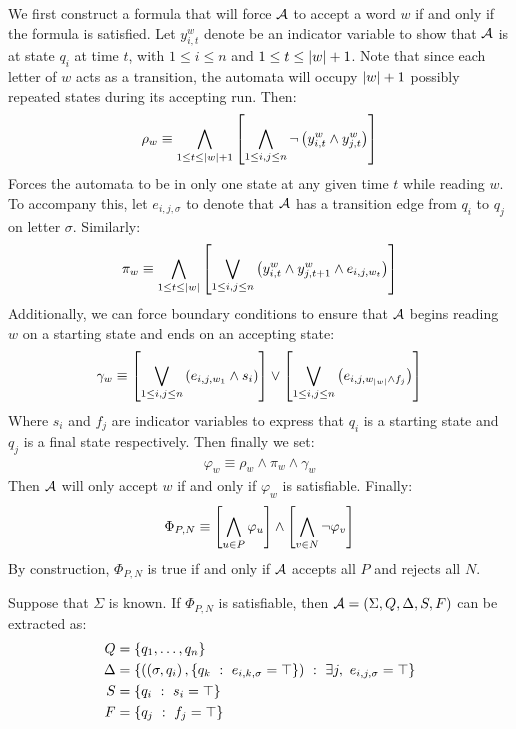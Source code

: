 We first construct a formula that will force \(\mathcal{A}\) to accept
a word \(w\) if and only if the formula is satisfied.
Let \(y_{i, t}^w\) denote be an indicator variable
to show that \(\mathcal{A}\) is at state \(q_i\) at time \(t\),
with \(1 \leq i \leq n\) and \(1 \leq t \leq \left\lvert w\right\rvert + 1\).
Note that since each letter of \(w\) acts as a transition,
the automata will occupy \(\left\lvert w\right\rvert + 1\) possibly repeated
states during its accepting run.
Then:
\begin{align*}
  \rho_w \equiv
    \bigwedge_{1 \leq t \leq \left\lvert w\right\rvert + 1}
      \left[\bigwedge_{1 \leq i, j \leq n}
        \neg \left(y_{i, t} ^w \land y_{j, t} ^w\right)\right]
\end{align*}
Forces the automata to be in only one state at any given time \(t\)
while reading \(w\).
To accompany this, let \(e_{i, j, \sigma}\) to denote
that \(\mathcal{A}\) has a transition edge from \(q_i\) to \(q_j\)
on letter \(\sigma\).
Similarly:
\begin{align*}
  \pi_w \equiv
    \bigwedge_{1 \leq t \leq \left\lvert w\right\rvert}
      \left[\bigvee_{1 \leq i, j \leq n}
      \left(y_{i, t} ^w \land y_{j, t + 1} ^w \land e_{i, j, w_t}\right)\right]
\end{align*}
Additionally, we can force boundary conditions to ensure that \(\mathcal{A}\)
begins reading \(w\) on a starting state and ends on an accepting state:
\begin{align*}
  \gamma_{w} \equiv
    \left[\bigvee_{1 \leq i, j \leq n}
        \left(e_{i, j, w_{1}} \land s_i\right)\right]
      \lor
    \left[\bigvee_{1 \leq i, j \leq n}
        \left(e_{i, j, w_{\left\lvert w\right\rvert} \land f_j}\right)\right]
\end{align*}
Where \(s_i\) and \(f_j\) are indicator variables to express that
\(q_i\) is a starting state and \(q_j\) is a final state respectively.
Then finally we set:
\begin{align*}
  \varphi_{w} \equiv \rho_w \land \pi_w \land \gamma_w
\end{align*}
Then \(\mathcal{A}\) will only accept \(w\) if and only if \(\varphi_w\)
is satisfiable.
Finally:
\begin{align*}
  \Phi_{P, N} \equiv
    \left[\bigwedge_{u \in P} \varphi_u\right]
      \land
    \left[\bigwedge_{v \in N} \neg \varphi_v\right]
\end{align*}
By construction, \(\Phi_{P, N}\) is true if and only if \(\mathcal{A}\)
accepts all \(P\) and rejects all \(N\).

Suppose that \(\Sigma\) is known.
If \(\Phi_{P, N}\) is satisfiable,
then \(\mathcal{A} = \left(\Sigma, Q, \Delta, S, F\right)\) can be extracted as:
\begin{align*}
  Q &= \left\{q_1, \ldots, q_n\right\} \\
  \Delta &=
    \left\{\left(\left(\sigma, q_i\right),
                    \left\{q_k \  : \  e_{i, k, \sigma} = \top\right\}\right)
            \  : \  \exists j, \  e_{i, j, \sigma} = \top\right\} \\
  S &= \left\{q_i \  : \  s_i = \top\right\} \\
  F &= \left\{q_j \  : \  f_j = \top\right\}
\end{align*}


